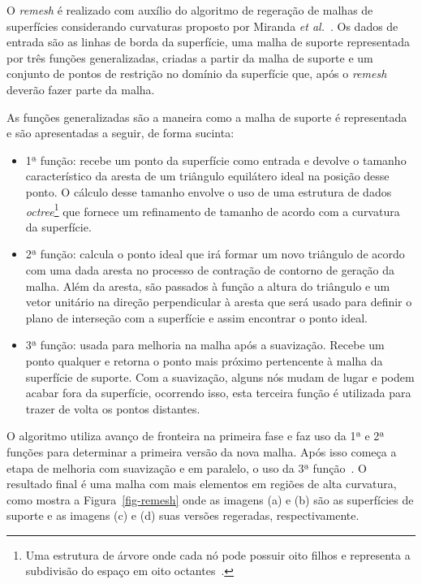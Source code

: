 O \textit{remesh} é realizado com auxílio do algoritmo de regeração de malhas de superfícies considerando curvaturas proposto por Miranda \textit{et al.}~\cite{Miranda}. Os dados de entrada são as linhas de borda da superfície, uma malha de suporte representada por três funções generalizadas, criadas a partir da malha de suporte e um conjunto de pontos de restrição no domínio da superfície que, após o \textit{remesh} deverão fazer parte da malha.

As funções generalizadas são a maneira como a malha de suporte é representada e são apresentadas a seguir, de forma sucinta:

\renewcommand{\labelitemi}{•}
\begin{itemize}
  \item 1ª função: recebe um ponto da superfície como entrada e devolve o tamanho característico da aresta de um triângulo equilátero ideal na posição desse ponto. O cálculo desse tamanho envolve o uso de uma estrutura de dados \textit{octree}\footnote{Uma estrutura de árvore onde cada nó pode possuir oito filhos e representa a subdivisão do espaço em oito octantes~\cite{Donald}.} que fornece um refinamento de tamanho de acordo com a curvatura da superfície.
  \item 2ª função: calcula o ponto ideal que irá formar um novo triângulo de acordo com uma dada aresta no processo de contração de contorno de geração da malha. Além da aresta, são passados à função a altura do triângulo e um vetor unitário na direção perpendicular à aresta que será usado para definir o plano de interseção com a superfície e assim encontrar o ponto ideal.
  \item 3ª função: usada para melhoria na malha após a suavização. Recebe um ponto qualquer e retorna o ponto mais próximo pertencente à malha da superfície de suporte. Com a suavização, alguns nós mudam de lugar e podem acabar fora da superfície, ocorrendo isso, esta terceira função é utilizada para trazer de volta os pontos distantes. 
\end{itemize}

O algoritmo utiliza avanço de fronteira na primeira fase e faz uso da 1ª e 2ª funções para determinar a primeira versão da nova malha. Após isso começa a etapa de melhoria com suavização e em paralelo, o uso da 3ª função~\cite{Miranda}. O resultado final é uma malha com mais elementos em regiões de alta curvatura, como mostra a Figura~\ref{fig-remesh} onde as imagens (a) e (b) são as superfícies de suporte e as imagens (c) e (d) suas versões regeradas, respectivamente.


